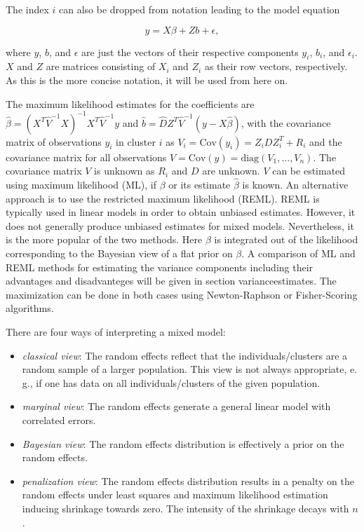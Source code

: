 \documentclass[12pt]{article}
\begin{document}
The index $i$ can also be dropped from notation leading to the model equation 

$$y = X \beta + Z b + \epsilon,$$

where $y$, $b$, and $\epsilon$ are just the vectors of their respective components $y_i$, $b_i$, and    $\epsilon_i$. $X$ and $Z$ are matrices consisting of $X_i$ and $Z_i$ as their row vectors, respectively. As this is the more concise notation, it will be used from here on.

The maximum likelihood estimates for the coefficients are $\hat{\beta} = (X^T \hat{V}^{-1} X)^{-1} X^T \hat{V}^{-1}y$ and $\hat{b} = \hat{D}Z^T\hat{V}^{-1} (y-X\hat{\beta})$, with the covariance matrix of observations $y_i$ in cluster $i$ as $V_i = \mathrm{Cov}(y_i) = Z_iDZ_i^T + R_i$ and the covariance matrix for all observations $V = \mathrm{Cov}(y) = \mathrm{diag}(V_1,...,V_n)$.
The covariance matrix $V$ is unknown as $R_i$ and $D$ are unknown. $V$ can be estimated  using maximum likelihood (ML), if $\beta$ or its estimate $\hat{\beta}$ is known. An alternative approach is to use the restricted  maximum likelihood  (REML). REML is typically used in linear models in order to obtain unbiased estimates. However, it does not generally produce unbiased estimates for mixed models. Nevertheless, it is the more popular of the two methods. Here $\beta$ is integrated out of the likelihood corresponding to the Bayesian view of a flat prior on $\beta$. A comparison of ML and REML methods for estimating the variance components including their advantages and disadvanteges will be given in section {varianceestimates}.  The maximization can be done in both cases using Newton-Raphson or Fisher-Scoring algorithms. 

There are four ways of interpreting a mixed model:
\begin{itemize}
\item \textit{classical view}: The random effects reflect that the individuals/clusters are a random sample of a larger population. This view is not always appropriate, e.\,g., if one has data on all individuals/clusters of the given population.
\item \textit{marginal view}: The random effects generate a general linear
model with correlated errors.
\item \textit{Bayesian view}: The random effects distribution is effectively a prior on the random effects.
\item \textit{penalization view}: The random effects distribution results in a penalty on the random effects under least squares and maximum likelihood estimation inducing shrinkage towards zero. The intensity of the shrinkage decays with $n$.
\end{itemize}
\end{document}
